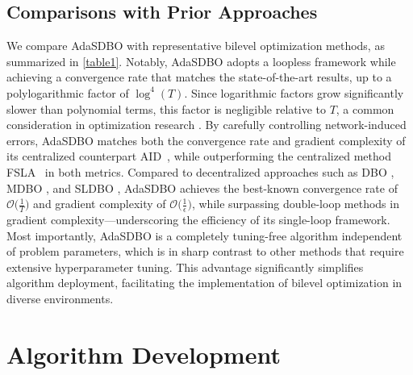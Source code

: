 \documentclass{article}
\theoremstyle{plain}
\theoremstyle{definition}
\theoremstyle{remark}
\begin{document}
\subsection{Comparisons with Prior Approaches}
\vspace{-0.15cm}
We compare AdaSDBO with representative bilevel optimization methods, as summarized in \cref{table1}. Notably, AdaSDBO adopts a loopless framework while achieving a convergence rate that matches the state-of-the-art results, up to a polylogarithmic factor of $\log^4(T)$. Since logarithmic factors grow significantly slower than polynomial terms, this factor is negligible relative to $T$, a common consideration in optimization research \citep{yang2022nest,li2024problem}. By carefully controlling network-induced errors, AdaSDBO matches both the convergence rate and gradient complexity of its centralized counterpart AID~\citep{ji2022will}, while outperforming the centralized method FSLA~\citep{li2022fully} in both metrics.
Compared to decentralized approaches such as DBO \citep{chen2024optimal}, MDBO \citep{gao2023convergence}, and SLDBO \citep{dong2023single}, AdaSDBO achieves the best-known convergence rate of $\mathcal{O}\big(\frac{1}{T}\big)$ and gradient complexity of $\mathcal{O}\big(\frac{1}{\epsilon}\big)$, while surpassing double-loop methods in gradient complexity—underscoring the efficiency of its single-loop framework. Most importantly, AdaSDBO is a completely tuning-free algorithm independent of problem parameters, which is in sharp contrast to other methods that require extensive hyperparameter tuning. This advantage significantly simplifies algorithm deployment,
facilitating the implementation of bilevel optimization in diverse environments.

\vspace{-0.3cm}
\section{Algorithm Development}
\vspace{-0.2cm}
\end{document}
